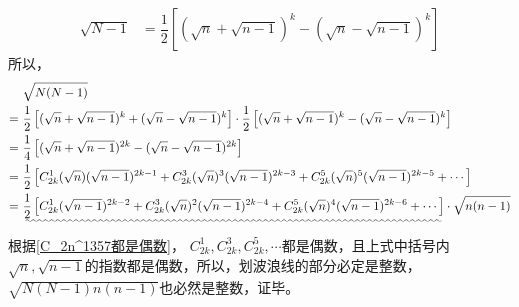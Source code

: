 \begin{enumerate}[label={【\textbf{例\thechapter.\arabic*}】},
 leftmargin=\inteval{\myenumleftmargin}pt,
 itemsep=\inteval{\myenumitempsep}pt,
 itemindent=\inteval{\myenumitemindent}pt]
\begin{align*}
    \sqrt{N-1} &=\dfrac{1}{2}\left[(\sqrt{n}+\sqrt{n-1})^k
    -(\sqrt{n}-\sqrt{n-1})^k\right] 
\end{align*}
所以，
{\small \begin{align*}
        &\ \sqrt{N(N-1)}\\
        =&\ \dfrac{1}{2}\left[(\sqrt{n}+\sqrt{n-1})^k
        +(\sqrt{n}-\sqrt{n-1})^k\right]\cdot
        \dfrac{1}{2}\left[(\sqrt{n}+\sqrt{n-1})^k
        -(\sqrt{n}-\sqrt{n-1})^k\right] \\
        =&\ \dfrac{1}{4}\left[(\sqrt{n}+\sqrt{n-1})^{2k}-
        (\sqrt{n}-\sqrt{n-1})^{2k}\right] \\  
        =&\ \dfrac{1}{2}\left[C_{2k}^1(\sqrt{n})(\sqrt{n-1})^{2k-1}
        +C_{2k}^3(\sqrt{n})^3(\sqrt{n-1})^{2k-3}+
        C_{2k}^5(\sqrt{n})^5(\sqrt{n-1})^{2k-5}+\cdots\right] \\
        =&\ \uwave{\dfrac{1}{2}\left[C_{2k}^1(\sqrt{n-1})^{2k-2}
            +C_{2k}^3(\sqrt{n})^2(\sqrt{n-1})^{2k-4}+
            C_{2k}^5(\sqrt{n})^4(\sqrt{n-1})^{2k-6}+\cdots\right]}
        \cdot\sqrt{n(n-1)}
\end{align*} }
根据\ref{C_2n^1357都是偶数}，
$ C_{2k}^1,C_{2k}^3,C_{2k}^5,\cdots $都是偶数，且上式中括号内
$ \sqrt{n},\sqrt{n-1} $的指数都是偶数，所以，划波浪线的部分必定是整数，
$ \sqrt{N(N-1)n(n-1)} $也必然是整数，证毕。


\end{enumerate}
